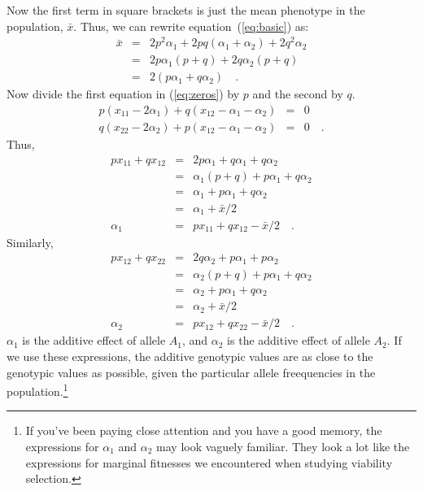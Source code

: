 \documentclass[12pt]{article}
\begin{document}
Now the first term in square brackets is just the mean phenotype in
the population, $\bar x$.  Thus, we can rewrite
equation~(\ref{eq:basic}) as:
\begin{eqnarray}
{\bar x} &=& 2p^2\alpha_1 + 2pq(\alpha_1 + \alpha_2)
                        +2q^2\alpha_2 \nonumber \\
                     &=& 2p\alpha_1(p+q) + 2q\alpha_2(p+q) \nonumber \\
                     &=& 2(p\alpha_1 + q\alpha_2) \quad . \label{eq:alpha_bar}
\end{eqnarray}
Now divide the first equation in (\ref{eq:zeros}) by $p$ and the
second by $q$.
\begin{eqnarray}
p(x_{11} - 2\alpha_1) + q(x_{12} - \alpha_1 - \alpha_2) &=& 0
\label{eq:zeros_divide_1} \\
q(x_{22} - 2\alpha_2) + p(x_{12} - \alpha_1 - \alpha_2) &=& 0 \quad
. \label{eq:zeros_divide_2}
\end{eqnarray}
Thus,
\begin{eqnarray*}
px_{11} + qx_{12} &=& 2p\alpha_1 + q\alpha_1 + q\alpha_2 \\
 &=& \alpha_1(p + q) + p\alpha_1 + q\alpha_2 \\
 &=& \alpha_1 + p\alpha_1 + q\alpha_2 \\
 &=& \alpha_1 + {\bar x}/2 \\
\alpha_1 &=& px_{11} + qx_{12} - {\bar x}/2 \quad .
\end{eqnarray*}
Similarly,
\begin{eqnarray*}
px_{12} + qx_{22} &=& 2q\alpha_2 + p\alpha_1 + p\alpha_2 \\
 &=& \alpha_2(p + q) + p\alpha_1 + q\alpha_2 \\
 &=& \alpha_2 + p\alpha_1 + q\alpha_2 \\
 &=& \alpha_2 + {\bar x}/2 \\
\alpha_2 &=& px_{12} + qx_{22} - {\bar x}/2 \quad .
\end{eqnarray*}
$\alpha_1$ is the additive effect of allele $A_1$, and $\alpha_2$ is
the additive effect of allele $A_2$. If we use these expressions, the
additive genotypic values are as close to the genotypic values as
possible, given the particular allele freequencies in the
population.\footnote{If you've been paying close attention and you
  have a good memory, the expressions for $\alpha_1$ and $\alpha_2$
  may look vaguely familiar. They look a lot like the expressions for
  marginal fitnesses we encountered when studying viability
  selection.}
\end{document}
